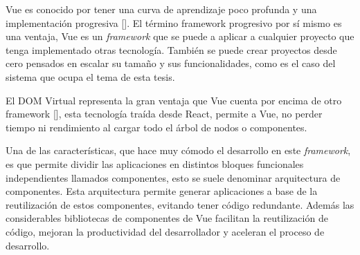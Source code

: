 
Vue es conocido por tener una curva de aprendizaje poco profunda y una implementación progresiva [\cite{49}]. El término framework progresivo por sí mismo es una ventaja, Vue es un \textit{framework} que se puede a aplicar a cualquier proyecto que tenga implementado otras tecnología. También se puede crear proyectos desde cero pensados en escalar su tamaño y sus funcionalidades, como es el caso del sistema que ocupa el tema de esta tesis.


El DOM Virtual representa la gran ventaja que Vue cuenta por encima de otro framework [\cite{52}], esta tecnología traída desde React, permite a Vue, no perder tiempo ni rendimiento al cargar todo el árbol de nodos o componentes.

Una de las características, que hace muy cómodo el desarrollo en este \textit{framework}, es que permite dividir las aplicaciones en distintos bloques funcionales independientes llamados componentes, esto se suele denominar arquitectura de componentes. Esta arquitectura permite generar aplicaciones a base de la reutilización de estos componentes, evitando tener código redundante. Además las considerables bibliotecas de componentes de Vue facilitan la reutilización de código, mejoran la productividad del desarrollador y aceleran el proceso de desarrollo.



